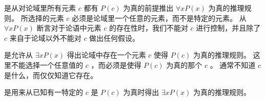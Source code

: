 {{        是从对论域里所有元素 $c$ 都有 $P(c)$ 为真的前提推出 $\forall x P(x)$ 为真的推理规则。
        所选择的元素 $c$ 必须是论域里一个任意的元素，而不是特定的元素。
        从 $\forall x P(x)$ 断言对于论语中元素 $c$ 的存在性时，我们不能对 $c$ 进行控制，并且除了 $c$ 来自于论域以外不能对 $c$ 做出任何假设。

        是允许从 $\exists x P(x)$ 得出论域中存在一个元素 $c$ 使得 $P(c)$ 为真的推理规则。
        这里不能选择一个任意值的 $c$ ，而必须是使得 $P(c)$ 为真的那个 $c$ 。
        通常不知道 $c$ 是什么，而仅仅知道它存在。

        是用来从已知有一特定的 $c$ 是 $P(c)$ 为真时得出 $\exists x P(x)$ 为真的推理规则。
    }
}
